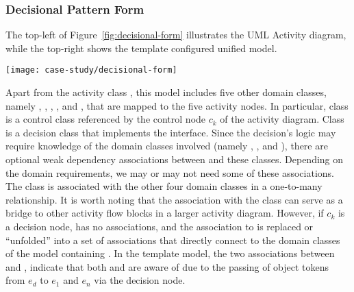 \subsubsection{Decisional Pattern Form} \label{sect:decisional-pattern}
The top-left of Figure~\ref{fig:decisional-form} illustrates the UML Activity diagram, while the top-right shows the template configured unified model.
\begin{figure*}[ht]
	\begin{center}
		\texttt{[image: case-study/decisional-form]}
	\end{center}
	\vspace{-0.5cm}
	\caption{The decisional pattern form.} %
	\label{fig:decisional-form}
	\vspace{-0.3cm}
\end{figure*}
Apart from the activity class , this model includes five other domain classes, namely , , , , and , that are mapped to the five activity nodes. In particular, class  is a control class referenced by the control node $c_k$ of the activity diagram. Class  is a decision class that implements the  interface. Since the decision's logic may require knowledge of the domain classes involved (namely , , and ), there are optional weak dependency associations between  and these classes. Depending on the domain requirements, we may or may not need some of these associations.
%
The class  is associated with the other four domain classes in a one-to-many relationship. It is worth noting that the association with the class  can serve as a bridge to other activity flow blocks in a larger activity diagram. However, if $c_k$ is a decision node,  has no associations, and the association to  is replaced or ``unfolded'' into a set of associations that directly connect  to the domain classes of the model containing . In the template model, the two associations between  and ,  indicate that both  and  are aware of  due to the passing of object tokens from $e_d$ to $e_1$ and $e_n$ via the decision node.


